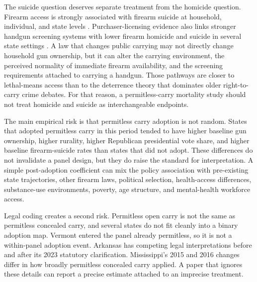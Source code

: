 \documentclass[11pt]{article}
\begin{document}
The suicide question deserves separate treatment from the homicide question. Firearm access is strongly associated with firearm suicide at household, individual, and state levels \citep{miller2002,wintemute1999,studdert2020}. Purchaser-licensing evidence also links stronger handgun screening systems with lower firearm homicide and suicide in several state settings \citep{mccourt2020}. A law that changes public carrying may not directly change household gun ownership, but it can alter the carrying environment, the perceived normality of immediate firearm availability, and the screening requirements attached to carrying a handgun. Those pathways are closer to lethal-means access than to the deterrence theory that dominates older right-to-carry crime debates. For that reason, a permitless-carry mortality study should not treat homicide and suicide as interchangeable endpoints.

The main empirical risk is that permitless carry adoption is not random. States that adopted permitless carry in this period tended to have higher baseline gun ownership, higher rurality, higher Republican presidential vote share, and higher baseline firearm-suicide rates than states that did not adopt. These differences do not invalidate a panel design, but they do raise the standard for interpretation. A simple post-adoption coefficient can mix the policy association with pre-existing state trajectories, other firearm laws, political selection, health-access differences, substance-use environments, poverty, age structure, and mental-health workforce access.

Legal coding creates a second risk. Permitless open carry is not the same as permitless concealed carry, and several states do not fit cleanly into a binary adoption map. Vermont entered the panel already permitless, so it is not a within-panel adoption event. Arkansas has competing legal interpretations before and after its 2023 statutory clarification. Mississippi's 2015 and 2016 changes differ in how broadly permitless concealed carry applied. A paper that ignores these details can report a precise estimate attached to an imprecise treatment.
\end{document}
